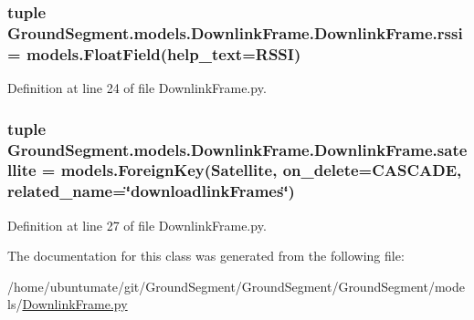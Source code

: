 \subsubsection[{rssi}]{\setlength{\rightskip}{0pt plus 5cm}tuple Ground\+Segment.\+models.\+Downlink\+Frame.\+Downlink\+Frame.\+rssi = models.\+Float\+Field(help\+\_\+text=\textquotesingle{}R\+S\+S\+I\textquotesingle{})\hspace{0.3cm}{\ttfamily [static]}}\label{class_ground_segment_1_1models_1_1_downlink_frame_1_1_downlink_frame_a2c3915b3ca05d908b523d1bdfc7f73dc}


Definition at line 24 of file Downlink\+Frame.\+py.

\hypertarget{class_ground_segment_1_1models_1_1_downlink_frame_1_1_downlink_frame_af6fd44276a5cc222f51dfc643e38911a}{}
\subsubsection[{satellite}]{\setlength{\rightskip}{0pt plus 5cm}tuple Ground\+Segment.\+models.\+Downlink\+Frame.\+Downlink\+Frame.\+satellite = models.\+Foreign\+Key({\bf Satellite}, on\+\_\+delete=C\+A\+S\+C\+A\+D\+E, related\+\_\+name=\char`\"{}downloadlink\+Frames\char`\"{})\hspace{0.3cm}{\ttfamily [static]}}\label{class_ground_segment_1_1models_1_1_downlink_frame_1_1_downlink_frame_af6fd44276a5cc222f51dfc643e38911a}


Definition at line 27 of file Downlink\+Frame.\+py.



The documentation for this class was generated from the following file\+:\begin{DoxyCompactItemize}
\item 
/home/ubuntumate/git/\+Ground\+Segment/\+Ground\+Segment/\+Ground\+Segment/models/\hyperlink{_downlink_frame_8py}{Downlink\+Frame.\+py}\end{DoxyCompactItemize}
